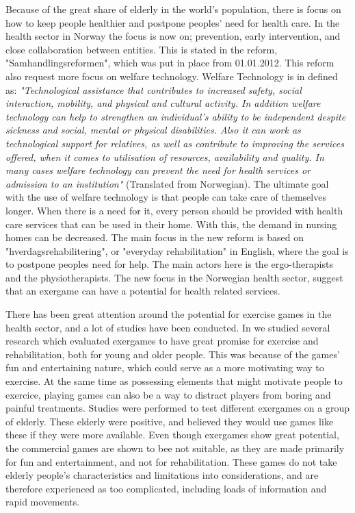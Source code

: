 Because of the great share of elderly in the world's population, there is focus on how to keep people healthier and postpone peoples' need for health care.  In the health sector in Norway the focus is now on; prevention, early intervention, and close collaboration between entities. This is stated in the reform, "Samhandlingsreformen", which was put in place from 01.01.2012. This reform also request more focus on welfare technology. Welfare Technology is in \cite{welfare} defined as: \emph{"Technological assistance that contributes to increased safety, social interaction, mobility, and physical and cultural activity. In addition welfare technology can help to strengthen an individual's ability to be independent despite sickness and social, mental or physical disabilities. Also it can work as technological support for relatives, as well as contribute to improving the services offered, when it comes to utilisation of resources, availability and quality. In many cases welfare technology can prevent the need for health services or admission to an institution"} (Translated from Norwegian). The ultimate goal with the use of welfare technology is that people can take care of themselves longer. When there is a need for it, every person should be provided with health care services that can be used in their home. With this, the demand in nursing homes can be decreased. The main focus in the new reform is based on "hverdagsrehabilitering", or "everyday rehabilitation" in English, where the goal is to postpone peoples need for help. The main actors here is the ergo-therapists and the physiotherapists. The new focus in the Norwegian health sector, suggest that an exergame can have a potential for health related services.

There has been great attention around the potential for exercise games in the health sector, and a lot of studies have been conducted. In \cite{project} we studied several research which evaluated exergames to have great promise for exercise and rehabilitation, both for young and older people. This was because of the games' fun and entertaining nature, which could serve as a more motivating way to exercise. At the same time as possessing elements that might motivate people to exercice, playing games can also be a way to distract players from boring and painful treatments. Studies were performed to test different exergames on a group of elderly. These elderly were positive, and believed they would use games like these if they were more available. Even though exergames show great potential, the commercial games  are shown to bee not suitable, as they are made primarily for fun and entertainment, and not for rehabilitation. These games do not take elderly people's characteristics and limitations into considerations, and are therefore experienced as too complicated, including loads of information and rapid movements.

